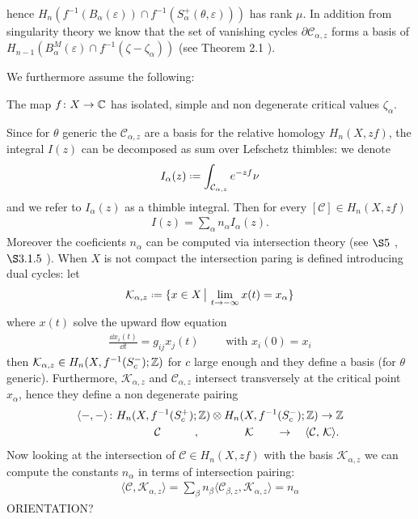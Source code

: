 \documentclass[11pt,a4paper,twoside,leqno,noamsfonts]{amsart}
\numberwithin{equation}{section}
\begin{document}
hence $H_n\left(f^{-1}(B_\alpha(\varepsilon))\cap f^{-1}(S_\alpha^+(\theta,\varepsilon))\right)$ has rank $\mu$. In addition from singularity theory we know that the set of vanishing cycles $\partial\mathcal{C}_{\alpha,z}$ forms a basis of $H_{n-1}(B_\alpha^M(\varepsilon)\cap f^{-1}(\zeta-\zeta_\alpha)) $ (see Theorem 2.1 \cite{Arnold}).    

  

\color{magenta}
We furthermore assume the following:
\begin{assumption}\label{assumption_on_f}
The map $f\colon X\to\mathbb C$ has isolated, simple and non degenerate critical values $\zeta_\alpha$. 
\end{assumption}

  
\color{black}

Since for $\theta$ generic the $\mathcal{C}_{\alpha,z}$ are a basis for the relative homology $H_n(X,zf)$, the integral $I(z)$ can be decomposed as sum over Lefschetz thimbles: we denote 
\begin{equation}\label{int_alpha}
I_{\alpha}(z)\defeq\int_{\mathcal{C}_{\alpha,z}}e^{-zf}\nu
\end{equation}
and we refer to $I_{\alpha}(z)$ as a thimble integral. Then  for every $[\mathcal{C}]\in H_n(X,zf)$
\begin{align*}
I(z)=\sum_{\alpha}n_\alpha I_{\alpha}(z). 
\end{align*}
Moreover the coeficients $n_\alpha$ can be computed via intersection theory (see $\S 5$ \cite{pham}, $\S 3.1.5$ \cite{Witten}). When $X$ is not compact the intersection paring is defined introducing dual cycles: let 
\begin{align*}
\mathcal{K}_{\alpha,z}\defeq\lbrace x\in X\,\big\vert\, \lim_{t\to -\infty} x(t)=x_\alpha \rbrace
\end{align*} 
where $x(t)$ solve the upward flow equation
\begin{align*}
\frac{\dd x_i(t)}{\dd t}= g_{ij}x_j(t) \qquad \text{ with } x_i(0)=x_i
\end{align*}
then $\mathcal{K}_{\alpha,z}\in H_{n}(X,f^{-1}(S^-_c);\mathbb Z)$ for $c$ large enough and they define a basis (for $\theta$ generic). Furthermore, $\mathcal{K}_{\alpha,z}$ and $\mathcal{C}_{\alpha,z}$ intersect transversely at the critical point $x_\alpha$, hence they define a non degenerate pairing 
\begin{align*}
\langle -, -\rangle\colon H_n&(X,f^{-1}(S^+_c);\mathbb Z)\otimes H_n(X,f^{-1}(S^-_c);\mathbb Z)\to \mathbb Z \\
& \qquad \mathcal{C} \qquad\quad , \qquad\qquad \mathcal{K} \qquad \to \quad \langle\mathcal{C} , \, \mathcal{K}\rangle. 
\end{align*}
Now looking at the intersection of $\mathcal{C}\in H_n(X,zf)$ with the basis $\mathcal{K}_{\alpha,z}$ we can compute the constants $n_\alpha$ in terms of intersection pairing:
\begin{align*}
\langle \mathcal{C},\mathcal{K}_{\alpha,z}\rangle=\sum_{\beta}n_\beta\langle \mathcal{C}_{\beta,z},\mathcal{K}_{\alpha,z}\rangle=n_\alpha
\end{align*}
\color{magenta}
ORIENTATION? 
\end{document}
